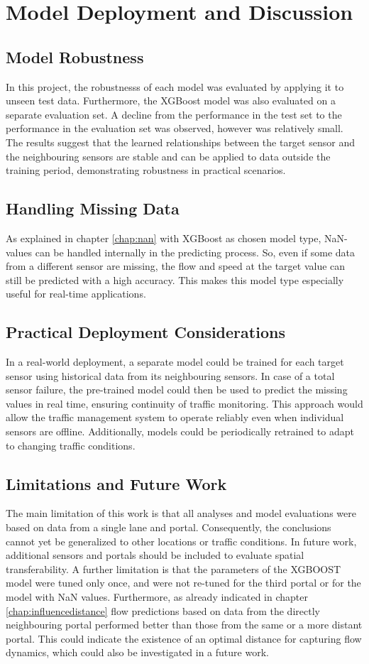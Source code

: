 	\section{Model Deployment and Discussion}
	\subsection{Model Robustness }
	In this project, the robustnesss of each model was evaluated by applying it to unseen test data.  Furthermore, the XGBoost model was also evaluated on a separate evaluation set.
	A decline from the performance in the test set to the performance in the evaluation set was observed, however was relatively small.  The results suggest that the learned relationships between the target sensor and the neighbouring sensors are stable and can be applied to data outside the training period, demonstrating robustness in practical scenarios.
	\subsection{Handling Missing  Data}
	As explained in chapter \ref{chap:nan} with XGBoost as chosen model type, NaN-values can be handled internally in the predicting process. So, even if some data from a different sensor are missing, the flow and speed at the target value can still be predicted with a high accuracy. This makes this model type especially useful for real-time applications.
	\subsection{Practical Deployment Considerations}
	In a real-world deployment, a separate model could be trained for each target sensor using historical data from its neighbouring sensors. In case of a total sensor failure, the pre-trained model could then be used to predict the missing values in real time, ensuring continuity of traffic monitoring. This approach would allow the traffic management system to operate reliably even when individual sensors are offline. Additionally, models could be periodically retrained to adapt to changing traffic conditions.
	\subsection{Limitations and Future Work}
	The main limitation of this work is that all analyses and model evaluations were based on data from a single lane and portal. Consequently, the conclusions cannot yet be generalized to other locations or traffic conditions.
	In future work, additional sensors and portals should be included to evaluate spatial transferability.  \newline
	A further limitation is that the parameters of the XGBOOST model were tuned only once, and were not re-tuned for the third portal or for the model with NaN values.\newline  
	Furthermore, as already indicated in chapter \ref{chap:influencedistance} flow predictions based on data from the directly neighbouring portal performed better than those from the same or a more distant portal. This could indicate the existence of an optimal distance for capturing flow dynamics, which could also be investigated in a future work.
	
